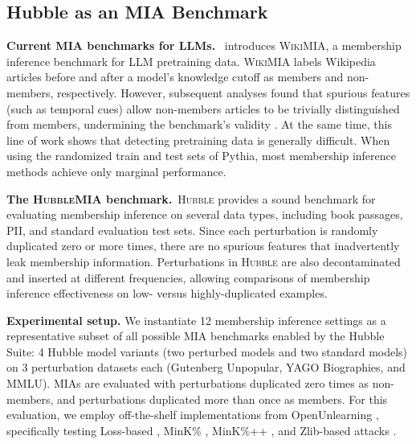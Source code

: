 \documentclass{article} %
\begin{document}
\subsection{Hubble as an MIA Benchmark}
\label{sec:hubble_as_mia}

\textbf{Current MIA benchmarks for LLMs.}~ \citet{minkMIA} introduces \textsc{WikiMIA}, a membership inference benchmark for LLM pretraining data. \textsc{WikiMIA} labels Wikipedia articles before and after a model’s knowledge cutoff as members and non-members, respectively. However, subsequent analyses found that spurious features (such as temporal cues) allow non-members articles to be trivially distinguished from members, undermining the benchmark's validity \citep{duan2024membershipinferenceattackswork,meeus_sok_2025, naseh2025syntheticdatamisleadevaluations}. At the same time, this line of work shows that detecting pretraining data is generally difficult. When using the randomized train and test sets of Pythia, most membership inference methods achieve only marginal performance.

\textbf{The \textsc{HubbleMIA} benchmark.}~\textsc{Hubble} provides a sound benchmark for evaluating membership inference on several data types, including book passages, PII, and standard evaluation test sets. Since each perturbation is randomly duplicated zero or more times, there are no spurious features that inadvertently leak membership information. Perturbations in \textsc{Hubble} are also decontaminated and inserted at different frequencies, allowing comparisons of membership inference effectiveness on low- versus highly-duplicated examples. %

\textbf{Experimental setup.} We instantiate 12 membership inference settings as a representative subset of all possible MIA benchmarks enabled by the Hubble Suite: 4 Hubble model variants (two perturbed models and two standard models) on 3 perturbation datasets each (Gutenberg Unpopular, YAGO Biographies, and MMLU). MIAs are evaluated with perturbations duplicated zero times as non-members, and perturbations duplicated more than once as members. For this evaluation, we employ off-the-shelf implementations from OpenUnlearning \citep{dorna2025openunlearningacceleratingllmunlearning}, specifically testing Loss-based \citep{LossMIA}, MinK\% \citep{minkMIA}, MinK\%++ \citep{minkplusplusMIA}, and Zlib-based attacks \citep{carlini_extracting_2021}.
\end{document}
